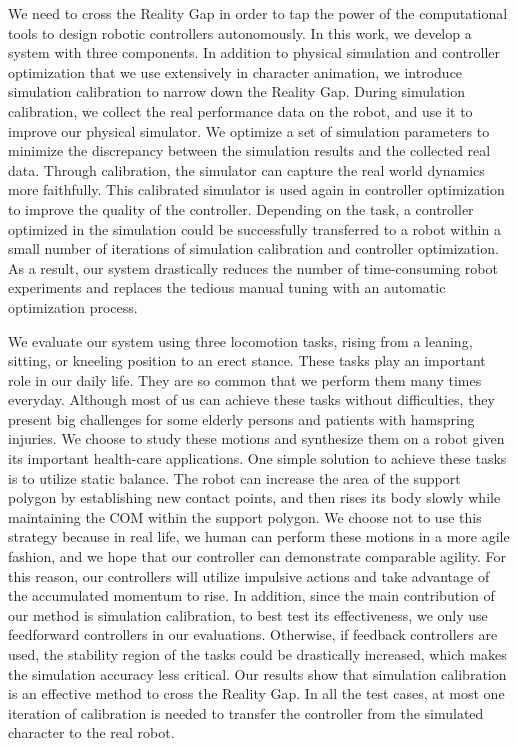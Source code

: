 We need to cross the Reality Gap in order to tap the power of the computational tools to design robotic controllers autonomously. In this work, we develop a system with three components. In addition to physical simulation and controller optimization that we use extensively in character animation, we introduce simulation calibration to narrow down the Reality Gap. During simulation calibration, we collect the real performance data on the robot, and use it to improve our physical simulator. We optimize a set of simulation parameters to minimize the discrepancy between the simulation results and the collected real data. Through calibration, the simulator can capture the real world dynamics more faithfully. This calibrated simulator is used again in controller optimization to improve the quality of the controller. Depending on the task, a controller optimized in the simulation could be successfully transferred to a robot within a small number of iterations of simulation calibration and controller optimization. As a result, our system drastically reduces the number of time-consuming robot experiments and replaces the tedious manual tuning with an automatic optimization process. 

We evaluate our system using three locomotion tasks, rising from a leaning, sitting, or kneeling position to an erect stance. These tasks play an important role in our daily life. They are so common that we perform them many times everyday. Although most of us can achieve these tasks without difficulties, they present big challenges for some elderly persons and patients with hamspring injuries. We choose to study these motions and synthesize them on a robot given its important health-care applications. One simple solution to achieve these tasks is to utilize static balance. The robot can increase the area of the support polygon by establishing new contact points, and then rises its body slowly while maintaining the COM within the support polygon. We choose not to use this strategy because in real life, we human can perform these motions in a more agile fashion, and we hope that our controller can demonstrate comparable agility. For this reason, our controllers will utilize impulsive actions and take advantage of the accumulated momentum to rise. In addition, since the main contribution of our method is simulation calibration, to best test its effectiveness, we only use feedforward controllers in our evaluations. Otherwise, if feedback controllers are used, the stability region of the tasks could be drastically increased, which makes the simulation accuracy less critical. Our results show that simulation calibration is an effective method to cross the Reality Gap. In all the test cases, at most one iteration of calibration is needed to transfer the controller from the simulated character to the real robot. 